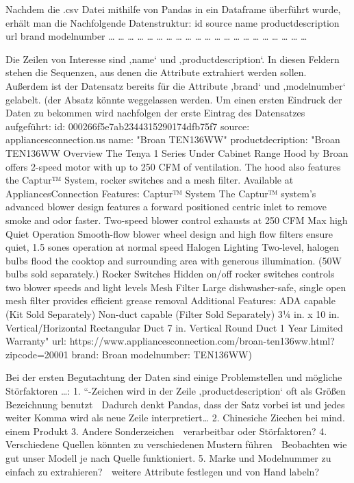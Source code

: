 \documentclass[paper=a4,12pt,listof=totoc]{scrartcl}%
\begin{document}
		Nachdem die .csv Datei mithilfe von Pandas in ein Dataframe überführt wurde, erhält man die Nachfolgende Datenstruktur:
		id	source	name 	productdescription	url	brand	modelnumber
		…	…	…	…	…	…	…
		…	…	…	…	…	…	…
		…	…	…	…	…	…	…
		
		Die Zeilen von Interesse sind ‚name‘ und ‚productdescription‘. In diesen Feldern stehen die Sequenzen, aus denen die Attribute extrahiert werden sollen. Außerdem ist der Datensatz bereits für die Attribute ‚brand‘ und ‚modelnumber‘ gelabelt. 
		(der Absatz könnte weggelassen werden. Um einen ersten Eindruck der Daten zu bekommen wird nachfolgen der erste Eintrag des Datensatzes aufgeführt:
		id: 000266f5e7ab2344315290174dfb75f7
		source: appliancesconnection.us
		name: "Broan TEN136WW"
		productdecription: "Broan TEN136WW Overview The Tenya 1 Series Under Cabinet Range Hood by Broan offers 2-speed motor with up to 250 CFM of ventilation. The hood also features the Captur™ System, rocker switches and a mesh filter. Available at AppliancesConnection Features: Captur™ System The Captur™ system’s advanced blower design features a forward positioned centric inlet to remove smoke and odor faster. Two-speed blower control exhausts at 250 CFM Max high Quiet Operation Smooth-flow blower wheel design and high flow filters ensure quiet, 1.5 sones operation at normal speed Halogen Lighting Two-level, halogen bulbs flood the cooktop and surrounding area with generous illumination. (50W bulbs sold separately.) Rocker Switches Hidden on/off rocker switches controls two blower speeds and light levels Mesh Filter Large dishwasher-safe, single open mesh filter provides efficient grease removal Additional Features: ADA capable (Kit Sold Separately) Non-duct capable (Filter Sold Separately) 3¼ in. x 10 in. Vertical/Horizontal Rectangular Duct 7 in. Vertical Round Duct 1 Year Limited Warranty"
		url: https://www.appliancesconnection.com/broan-ten136ww.html?zipcode=20001
		brand: Broan
		modelnumber: TEN136WW)
		
		Bei der ersten Begutachtung der Daten sind einige Problemstellen und mögliche Störfaktoren …:
		1.	“-Zeichen wird in der Zeile ‚productdescription‘ oft als Größen Bezeichnung benutzt  Dadurch denkt Pandas, dass der Satz vorbei ist und jedes weiter Komma wird als neue Zeile interpretiert…
		2.	Chinesiche Ziechen bei mind. einem Produkt
		3.	Andere Sonderzeichen  verarbeitbar oder Störfaktoren?
		4.	Verschiedene Quellen könnten zu verschiedenen Mustern führen  Beobachten wie gut unser Modell je nach Quelle funktioniert.
		5.	Marke und Modelnummer zu einfach zu extrahieren?  weitere Attribute festlegen und von Hand labeln?
		
		
	\printbibliography[title=Literaturverzeichnis]
\end{document}
